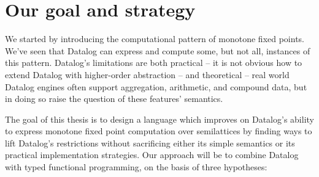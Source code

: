 



\section{Our goal and strategy}

We started by introducing the computational pattern of monotone fixed points.
We've seen that Datalog can express and compute some, but not all, instances of
this pattern. Datalog's limitations are both practical -- it is not obvious how
to extend Datalog with higher-order abstraction -- and theoretical -- real world
Datalog engines often support aggregation, arithmetic, and compound data, but in
doing so raise the question of these features' semantics.


The goal of this thesis is to design a language which improves on Datalog's
ability to express monotone fixed point computation over semilattices by finding
ways to lift Datalog's restrictions without sacrificing either its simple
semantics or its practical implementation strategies.
%
Our approach will be to combine Datalog with typed functional programming, on the basis of three hypotheses:

